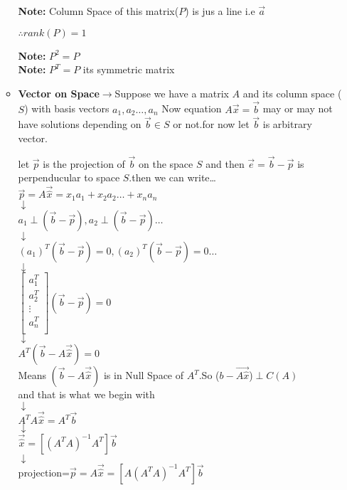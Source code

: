 \documentclass[a4paper,11pt]{article}
\numberwithin{equation}{section}
\begin{document}
\begin{itemize}
\begin{itemize}
\begin{center}
    \end{center}

\textbf{Note: }Column Space of this matrix($P$) is jus a line i.e $\vec{a} $
\begin{center}
    $\therefore rank(P)=1$
\end{center}
\textbf{Note: } $P^2=P$\\
\textbf{Note: }$P^T=P$ its symmetric matrix\\

\item \textbf{Vector on Space$\rightarrow$}Suppose we have a matrix $A$ and its column space ($S$) with basis vectors $a_1,a_2\dots,a_n$ Now equation $A\vec{x}=\vec{b}$ may or may not have solutions depending on $\vec{b} \in S$ or not.for now let $\vec{b}$ is arbitrary vector.
\begin{center}
    let $\vec{p}$ is the projection of $\vec{b}$ on the space $S$ and then $\vec{e}=\vec{b}-\vec{p}$ is perpenducular to space $S$.then we can write\dots\\
    \vspace{0.5cm}
    $\vec{p}=A\vec{\hat{x}}=x_1a_1+x_2a_2\dots+x_na_n$\\
    $\downarrow$\\
    $a_1\perp (\vec{b}-\vec{p}),a_2\perp (\vec{b}-\vec{p})\dots$\\
    $\downarrow$\\
    $(a_1)^T (\vec{b}-\vec{p})=0,(a_2)^T (\vec{b}-\vec{p})=0\dots$\\
    $\downarrow$\\
    $\begin{bmatrix}
        a_1^T\\a_2^T\\\vdots\\a_n^T\\
    \end{bmatrix} (\vec{b}-\vec{p})=0
    $\\
    $\downarrow$\\
    $A^T(\vec{b}-A\vec{\hat{x}})=0$\\
Means $(\vec{b}-A\vec{\hat{x}})$ is in Null Space of $A^T$.So ($b-\vec{A\hat{x}}$)$\perp $$C(A)$\\ and that is what we begin with\\
$\downarrow$\\
$A^TA\vec{\hat{x}}=A^T\vec{b}$\\
$\downarrow$\\
$\vec{\hat{x}}=\left[(A^TA)^{-1}A^T\right]\vec{b}$\\
$\downarrow$\\
projection=$\vec{p}=A\vec{\hat{x}}=\left[A(A^TA)^{-1}A^T\right]\vec{b}$


\end{center}
\end{itemize}
\end{itemize}
\end{document}
